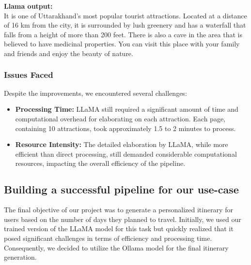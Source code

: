 \documentclass[conference]{IEEEtran}
\begin{document}
\begin{mdframed}[linewidth=1pt, innerleftmargin=15pt, innerrightmargin=15pt, innertopmargin=15pt, innerbottommargin=15pt]
\textbf{Llama output:} \\
\small
It is one of Uttarakhand's most popular tourist attractions. Located at a distance of 16 km from the city, it is surrounded by lush greenery and has a waterfall that falls from a height of more than 200 feet. There is also a cave in the area that is believed to have medicinal properties. You can visit this place with your family and friends and enjoy the beauty of nature.
\end{mdframed}

\subsubsection{Issues Faced}
Despite the improvements, we encountered several challenges:
\begin{itemize}
    \item \textbf{Processing Time:} LLaMA still required a significant amount of time and computational overhead for elaborating on each attraction. Each page, containing 10 attractions, took approximately 1.5 to 2 minutes to process.
    \item \textbf{Resource Intensity:} The detailed elaboration by LLaMA, while more efficient than direct processing, still demanded considerable computational resources, impacting the overall efficiency of the pipeline.
\end{itemize}


    \subsection{Building a successful pipeline for our use-case}

        The final objective of our project was to generate a personalized itinerary for users based on the number of days they planned to travel. Initially, we used our trained version of the LLaMA model for this task but quickly realized that it posed significant challenges in terms of efficiency and processing time. Consequently, we decided to utilize the Ollama model for the final itinerary generation.
\end{document}
